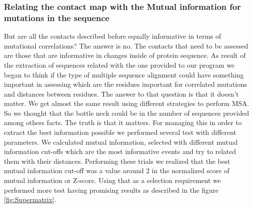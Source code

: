 \documentclass[12pt]{article}
\begin{document}
\subsubsection{Relating the contact map with the Mutual information for mutations in the sequence}
But are all the contacts described before equally informative in terms of mutational correlations? The answer is no. The contacts that need to be assessed are those that are informative in changes inside of protein sequence. As result of the extraction of sequences related with the one provided to our program we began to think if the type of multiple sequence alignment could have something important in assessing which are the residues important for correlated mutations and distances between residues. The answer to that question is that it doesn't matter. We get almost the same result using different strategies to perform MSA. So we thought that the bottle neck could be in the number of sequences provided among others facts. The truth is that it matters. For managing this in order to extract the best information possible we performed several test with different parameters. We calculated mutual information, selected with different mutual information cut-offs which are the most informative events and try to related them with their distances. Performing these trials we realized that the best mutual information cut-off was a value around 2 in the normalized score of mutual information or Z-score. Using that as a selection requirement we performed more test having promising results as described in the figure \ref{fig:Supermatrix}. \\
\end{document}
